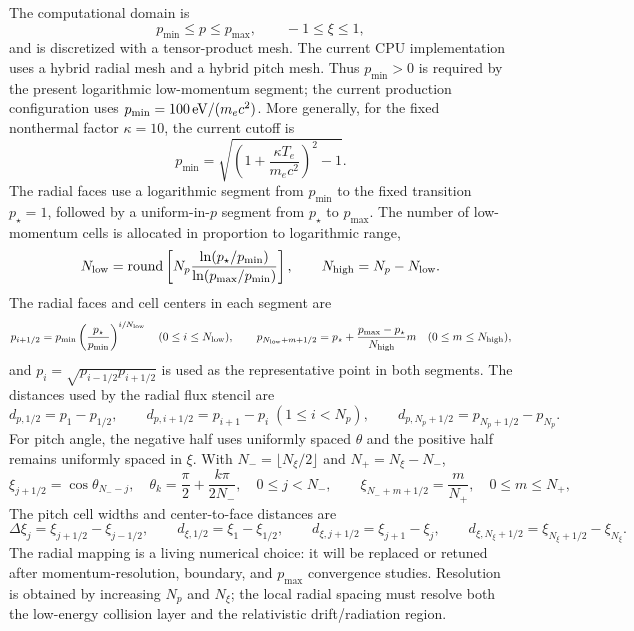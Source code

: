 \documentclass[11pt]{article}
\begin{document}
The computational domain is
\begin{equation}
 p_{\min}\le p\le p_{\max},\qquad -1\le\xi\le1,
\end{equation}
and is discretized with a tensor-product mesh.  The current CPU implementation uses
a hybrid radial mesh and a hybrid pitch mesh.  Thus $p_{\min}>0$ is required by the
present logarithmic low-momentum segment; the current production configuration uses
$p_{\min}=100\,{\rm eV}/(m_ec^2)$.  More generally, for the fixed nonthermal factor
$\kappa=10$, the current cutoff is
\begin{equation}
 p_{\min}=\sqrt{\left(1+\frac{\kappa T_e}{m_ec^2}\right)^2-1}.
 \label{eq:current_nonthermal_cutoff}
\end{equation}
The radial faces use a logarithmic segment from $p_{\min}$ to the fixed transition
$p_\star=1$, followed by a uniform-in-$p$ segment from $p_\star$ to $p_{\max}$.
The number of low-momentum cells is allocated in proportion to logarithmic range,
\begin{equation}
 N_{\rm low}=\operatorname{round}\left[
 N_p\frac{\ln(p_\star/p_{\min})}{\ln(p_{\max}/p_{\min})}
 \right],
 \qquad N_{\rm high}=N_p-N_{\rm low}.
 \label{eq:hybrid_radial_allocation}
\end{equation}
The radial faces and cell centers in each segment are
\begin{equation}
 p_{i+1/2}=p_{\min}\left(\frac{p_\star}{p_{\min}}\right)^{i/N_{\rm low}}
 \quad (0\le i\le N_{\rm low}),
 \qquad
 p_{N_{\rm low}+m+1/2}=p_\star+
 \frac{p_{\max}-p_\star}{N_{\rm high}}m
 \quad (0\le m\le N_{\rm high}),
 \label{eq:geometric_p_grid}
\end{equation}
and $p_i=\sqrt{p_{i-1/2}p_{i+1/2}}$ is used as the representative point in both
segments.
The distances used by the radial flux stencil are
\begin{equation}
 d_{p,1/2}=p_1-p_{1/2},\qquad
 d_{p,i+1/2}=p_{i+1}-p_i\;(1\le i<N_p),\qquad
 d_{p,N_p+1/2}=p_{N_p+1/2}-p_{N_p}.
 \label{eq:geometric_p_distances}
\end{equation}
For pitch angle, the negative half uses uniformly spaced $\theta$ and the positive
half remains uniformly spaced in $\xi$.  With
$N_-=\lfloor N_\xi/2\rfloor$ and $N_+=N_\xi-N_-$,
\begin{equation}
 \xi_{j+1/2}=\cos\theta_{N_- -j},
 \quad \theta_k=\frac{\pi}{2}+\frac{k\pi}{2N_-},
 \quad 0\le j<N_-,
 \qquad
 \xi_{N_-+m+1/2}=\frac{m}{N_+},
 \quad 0\le m\le N_+,
 \label{eq:current_xi_grid}
\end{equation}
The pitch cell widths and center-to-face distances are
\begin{equation}
 \Delta\xi_j=\xi_{j+1/2}-\xi_{j-1/2},\qquad
 d_{\xi,1/2}=\xi_1-\xi_{1/2},\qquad
 d_{\xi,j+1/2}=\xi_{j+1}-\xi_j,
 \qquad d_{\xi,N_\xi+1/2}=\xi_{N_\xi+1/2}-\xi_{N_\xi}.
 \label{eq:current_xi_distances}
\end{equation}
The radial mapping is a living numerical choice: it will be replaced or retuned after
momentum-resolution, boundary, and $p_{\max}$ convergence studies.  Resolution is
obtained by increasing $N_p$ and $N_\xi$; the local radial spacing must resolve both
the low-energy collision layer and the relativistic drift/radiation region.
\end{document}
